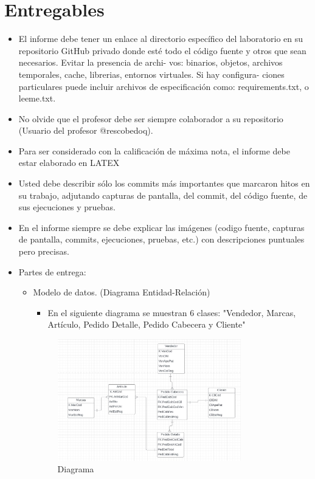\documentclass{article}
\begin{document}
    \section{Entregables}
    \begin{itemize}
        \item El informe debe tener un enlace al directorio específico del laboratorio en su repositorio GitHub
        privado donde esté todo el código fuente y otros que sean necesarios. Evitar la presencia de archi-
        vos: binarios, objetos, archivos temporales, cache, librerias, entornos virtuales. Si hay configura-
        ciones particulares puede incluir archivos de especificación como: requirements.txt, o leeme.txt.
        \item No olvide que el profesor debe ser siempre colaborador a su repositorio (Usuario del profesor
        @rescobedoq).
        \item Para ser considerado con la calificación de máxima nota, el informe debe estar elaborado en
        LATEX
        \item Usted debe describir sólo los commits más importantes que marcaron hitos en su trabajo,
        adjutando capturas de pantalla, del commit, del código fuente, de sus ejecuciones y pruebas.
        \item En el informe siempre se debe explicar las imágenes (codigo fuente, capturas de pantalla, commits,
        ejecuciones, pruebas, etc.) con descripciones puntuales pero precisas.
        \item Partes de entrega:
        \begin{itemize}
        
            \item Modelo de datos. (Diagrama Entidad-Relación)
            \begin{itemize}
                \item En el siguiente diagrama se muestran 6 clases: "Vendedor, Marcas, Artículo, Pedido Detalle, Pedido Cabecera y Cliente"
            \end{itemize}
            \begin{figure}[H]
		      \centering
                \includegraphics[width=0.8\textwidth,keepaspectratio]{img/Diagrama.jpeg}
		      \caption{Diagrama}
	   \end{figure}
 

\end{itemize}
\end{itemize}
\end{document}
